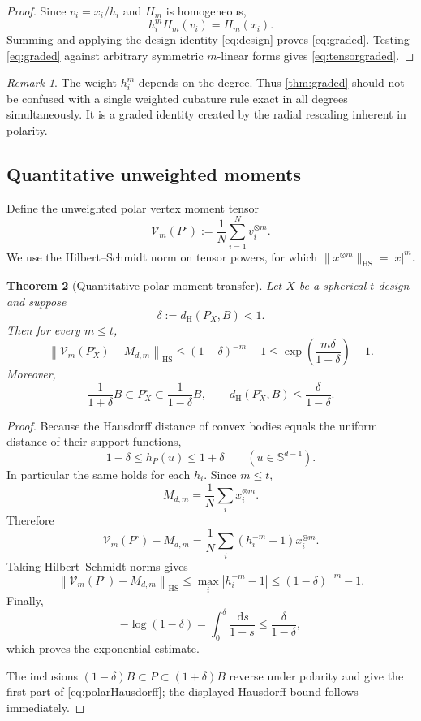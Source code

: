 \documentclass[11pt]{amsart}
\newtheorem{theorem}{Theorem}[section]
\theoremstyle{definition}
\theoremstyle{remark}
\newtheorem{remark}[theorem]{Remark}
\newcommand{\Sph}{\mathbb S}
\newcommand{\dd}{\,\mathrm d}
\newcommand{\norm}[1]{\left\lVert #1\right\rVert}
\newcommand{\dH}{d_{\mathrm H}}
\newcommand{\HS}{\mathrm{HS}}
\begin{document}
\begin{proof}
Since $v_i=x_i/h_i$ and $H_m$ is homogeneous,
\[
 h_i^mH_m(v_i)=H_m(x_i).
\]
Summing and applying the design identity \eqref{eq:design} proves \eqref{eq:graded}.  Testing \eqref{eq:graded} against arbitrary symmetric $m$-linear forms gives \eqref{eq:tensorgraded}.  \qedhere
\end{proof}

\begin{remark}
The weight $h_i^m$ depends on the degree.  Thus \cref{thm:graded} should not be confused with a single weighted cubature rule exact in all degrees simultaneously.  It is a graded identity created by the radial rescaling inherent in polarity.
\end{remark}

\subsection{Quantitative unweighted moments}

Define the unweighted polar vertex moment tensor
\[
 \mathcal V_m(P^\circ):=\frac1N\sum_{i=1}^Nv_i^{\otimes m}.
\]
We use the Hilbert--Schmidt norm on tensor powers, for which
$\|x^{\otimes m}\|_{\HS}=|x|^m$.

\begin{theorem}[Quantitative polar moment transfer]\label{thm:momenttransfer}
Let $X$ be a spherical $t$-design and suppose
\[
 \delta:=\dH(P_X,B)<1.
\]
Then for every $m\le t$,
\begin{equation}\label{eq:momentbound}
 \boxed{
 \norm{\mathcal V_m(P_X^\circ)-M_{d,m}}_{\HS}
 \le (1-\delta)^{-m}-1
 \le \exp\left(\frac{m\delta}{1-\delta}\right)-1.}
\end{equation}
Moreover,
\begin{equation}\label{eq:polarHausdorff}
 \frac1{1+\delta}B\subset P_X^\circ\subset\frac1{1-\delta}B,
 \qquad
 \dH(P_X^\circ,B)\le\frac{\delta}{1-\delta}.
\end{equation}
\end{theorem}

\begin{proof}
Because the Hausdorff distance of convex bodies equals the uniform distance of their support functions,
\[
 1-\delta\le h_P(u)\le1+\delta
 \qquad(u\in\Sph^{d-1}).
\]
In particular the same holds for each $h_i$.  Since $m\le t$,
\[
 M_{d,m}=\frac1N\sum_i x_i^{\otimes m}.
\]
Therefore
\[
 \mathcal V_m(P^\circ)-M_{d,m}
 =\frac1N\sum_i(h_i^{-m}-1)x_i^{\otimes m}.
\]
Taking Hilbert--Schmidt norms gives
\[
 \norm{\mathcal V_m(P^\circ)-M_{d,m}}_{\HS}
 \le\max_i|h_i^{-m}-1|
 \le(1-\delta)^{-m}-1.
\]
Finally,
\[
 -\log(1-\delta)
 =\int_0^\delta\frac{\dd s}{1-s}
 \le\frac{\delta}{1-\delta},
\]
which proves the exponential estimate.

The inclusions $(1-\delta)B\subset P\subset(1+\delta)B$ reverse under polarity and give the first part of \eqref{eq:polarHausdorff}; the displayed Hausdorff bound follows immediately.  \qedhere
\end{proof}
\end{document}

